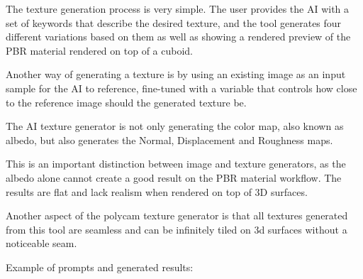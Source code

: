 \documentclass[a4paper,one side,12pt]{book}
\begin{document}
The texture generation process is very simple. The user provides the AI
with a set of keywords that describe the desired texture, and the tool
generates four different variations based on them as well as showing a
rendered preview of the PBR material rendered on top of a cuboid.

Another way of generating a texture is by using an existing image as an
input sample for the AI to reference, fine-tuned with a variable that
controls how close to the reference image should the generated texture
be.

The AI texture generator is not only generating the color map, also
known as albedo, but also generates the Normal, Displacement and
Roughness maps.

This is an important distinction between image and texture generators,
as the albedo alone cannot create a good result on the PBR material
workflow. The results are flat and lack realism when rendered on top of
3D surfaces.

Another aspect of the polycam texture generator is that all textures generated from this 
tool are seamless and can be infinitely tiled on 3d
surfaces without a noticeable seam.\newline

Example of prompts and generated results:
\end{document}
